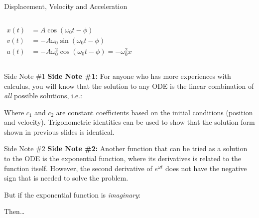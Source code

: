 \documentclass[12pt,compress,aspectratio=169]{beamer}
\begin{document}
\begin{frame}{Displacement, Velocity and Acceleration}
  \begin{columns}

    \begin{align*}
      x(t)&=A\cos(\omega_0 t-\phi)\\
      v(t)&=-A\omega_0\sin(\omega_0 t-\phi)\\
      a(t)&=-A\omega_0^2\cos(\omega_0 t-\phi)=-\omega_0^2x
    \end{align*}

  \end{columns}
\end{frame}



\begin{frame}{Side Note \#1}
  \textbf{Side Note \#1:} For anyone who has more experiences with calculus,
  you will know that the solution to any ODE is the linear combination of
  \emph{all} possible solutions, i.e.:


  Where $c_1$ and $c_2$ are constant coefficients based on the initial
  conditions (position and velocity). Trigonometric identities can be used to
  show that the solution form shown in previous slides is identical.
\end{frame}



\begin{frame}{Side Note \#2}
  \textbf{Side Note \#2:} Another function that can be tried as a solution to
  the ODE is the exponential function, where its derivatives is related to the
  function itself. However, the second derivative of $e^{\omega t}$ does not have
  the negative sign that is needed to solve the problem.


  But if the exponential function is \emph{imaginary}:


  \vspace{-.1in}Then\ldots
\end{frame}
\end{document}
